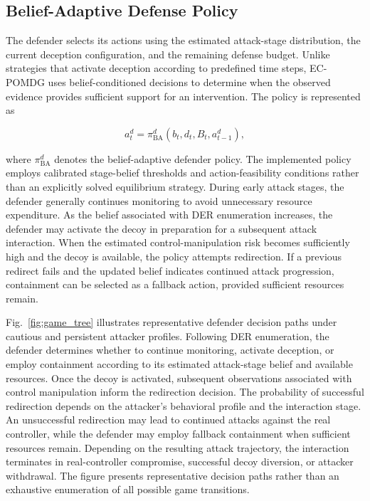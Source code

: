 \documentclass[10pt,conference]{IEEEtran}
\begin{document}
\subsection{Belief-Adaptive Defense Policy}

The defender selects its actions using the estimated attack-stage distribution, the current deception configuration, and the remaining defense budget. Unlike strategies that activate deception according to predefined time steps, EC-POMDG uses belief-conditioned decisions to determine when the observed evidence provides sufficient support for an intervention. The policy is represented as

\begin{equation}
a_t^{d} =
\pi_{\mathrm{BA}}^{d}
(b_t,d_t,B_t,a_{t-1}^{d}),
\label{eq:belief_policy}
\end{equation}

\noindent
where $\pi_{\mathrm{BA}}^{d}$ denotes the belief-adaptive defender policy. The implemented policy employs calibrated stage-belief thresholds and action-feasibility conditions rather than an explicitly solved equilibrium strategy. During early attack stages, the defender generally continues monitoring to avoid unnecessary resource expenditure. As the belief associated with DER enumeration increases, the defender may activate the decoy in preparation for a subsequent attack interaction. When the estimated control-manipulation risk becomes sufficiently high and the decoy is available, the policy attempts redirection. If a previous redirect fails and the updated belief indicates continued attack progression, containment can be selected as a fallback action, provided sufficient resources remain.

Fig.~\ref{fig:game_tree} illustrates representative defender decision paths under cautious and persistent attacker profiles. Following DER enumeration, the defender determines whether to continue monitoring, activate deception, or employ containment according to its estimated attack-stage belief and available resources. Once the decoy is activated, subsequent observations associated with control manipulation inform the redirection decision. The probability of successful redirection depends on the attacker's behavioral profile and the interaction stage. An unsuccessful redirection may lead to continued attacks against the real controller, while the defender may employ fallback containment when sufficient resources remain. Depending on the resulting attack trajectory, the interaction terminates in real-controller compromise, successful decoy diversion, or attacker withdrawal. The figure presents representative decision paths rather than an exhaustive enumeration of all possible game transitions.
\end{document}
